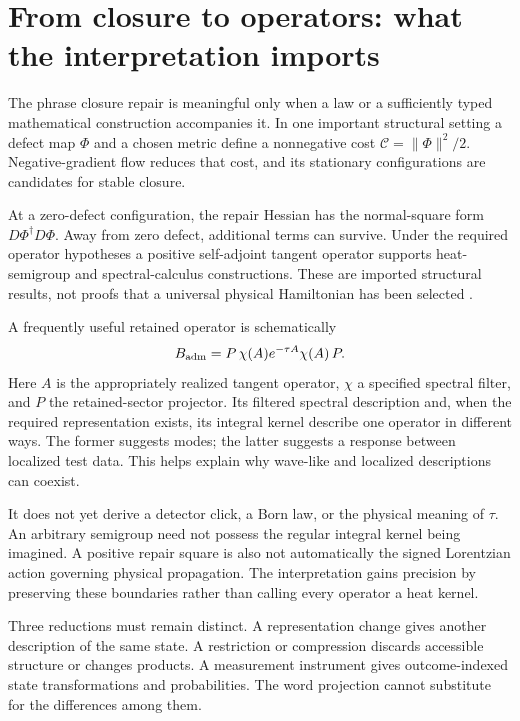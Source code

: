 \documentclass[11pt,a4paper]{article}
\begin{document}
\section{From closure to operators: what the interpretation imports}
\label{sec:repair}
The phrase closure repair is meaningful only when a law or a sufficiently typed mathematical construction accompanies it. In one important structural setting a defect map \(\Phi\) and a chosen metric define a nonnegative cost \(\mathcal C=\|\Phi\|^2/2\). Negative-gradient flow reduces that cost, and its stationary configurations are candidates for stable closure.

At a zero-defect configuration, the repair Hessian has the normal-square form \(D\Phi^\dagger D\Phi\). Away from zero defect, additional terms can survive. Under the required operator hypotheses a positive self-adjoint tangent operator supports heat-semigroup and spectral-calculus constructions. These are imported structural results, not proofs that a universal physical Hamiltonian has been selected \cite{NeroRepair}.

A frequently useful retained operator is schematically
\begin{equation}
B_{\rm adm}=P\,\chi(A)e^{-\tau A}\chi(A)\,P.
\end{equation}
Here \(A\) is the appropriately realized tangent operator, \(\chi\) a specified spectral filter, and \(P\) the retained-sector projector. Its filtered spectral description and, when the required representation exists, its integral kernel describe one operator in different ways. The former suggests modes; the latter suggests a response between localized test data. This helps explain why wave-like and localized descriptions can coexist.

It does not yet derive a detector click, a Born law, or the physical meaning of \(\tau\). An arbitrary semigroup need not possess the regular integral kernel being imagined. A positive repair square is also not automatically the signed Lorentzian action governing physical propagation. The interpretation gains precision by preserving these boundaries rather than calling every operator a heat kernel.

Three reductions must remain distinct. A representation change gives another description of the same state. A restriction or compression discards accessible structure or changes products. A measurement instrument gives outcome-indexed state transformations and probabilities. The word projection cannot substitute for the differences among them.
\end{document}
